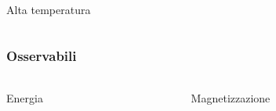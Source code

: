 \begin{frame}
\begin{columns}
\begin{column}{0.5\textwidth}
\begin{block}{Alta temperatura}
            \end{block}
        \end{column}
    \end{columns}

\end{frame}



\begin{frame}
    \frametitle{Osservabili}
    \framesubtitle{}

    \begin{columns}
        \begin{column}{0.5\textwidth}
            \begin{block}{Energia}

            \end{block}
        \end{column}
    
        \begin{column}{0.5\textwidth}
            \begin{block}{Magnetizzazione}

            \end{block}
        \end{column}
    \end{columns}

\end{frame}
